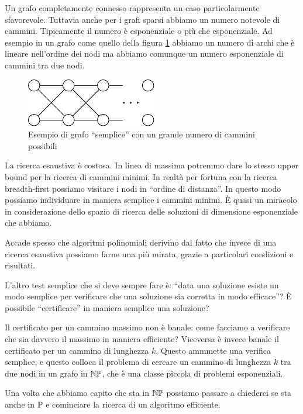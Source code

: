 Un grafo completamente connesso rappresenta un caso particolarmente sfavorevole. Tuttavia anche per
i grafi sparsi abbiamo un numero notevole di cammini. Tipicamente il numero è esponenziale o più
che esponenziale. Ad esempio in un grafo come quello della figura \ref{PathsNumber} abbiamo un
numero di archi che è lineare nell'ordine dei nodi ma abbiamo comunque un numero esponenziale di
cammini tra due nodi.

\begin{figure}[h]
    \begin{center}
        \includegraphics{./img/complexity_intro/ExponentialPathsNumber.pdf}
    \end{center}
    \caption{Esempio di grafo ``semplice'' con un grande numero di cammini possibili}
    \label{PathsNumber}
\end{figure}

La ricerca esaustiva è costosa. In linea di massima potremmo dare lo stesso upper bound per la
ricerca di cammini minimi. In realtà per fortuna con la ricerca breadth-first possiamo visitare i
nodi in ``ordine di distanza''. In questo modo possiamo individuare in maniera semplice i cammini
minimi. È quasi un miracolo in considerazione dello spazio di ricerca delle soluzioni di dimensione
esponenziale che abbiamo. 

Accade spesso che algoritmi polinomiali derivino dal fatto che invece di una ricerca esaustiva
possiamo farne una più mirata, grazie a particolari condizioni e risultati.

L'altro test semplice che si deve sempre fare è: ``data una soluzione esiste un modo semplice per
verificare che una soluzione sia corretta in modo efficace''? È possibile ``certificare'' in maniera
semplice una soluzione?

Il certificato per un cammino massimo non è banale: come facciamo a verificare che sia davvero il
massimo in maniera efficiente? Viceversa è invece banale il certificato per un cammino di lunghezza
$k$. Questo ammmette una verifica semplice, e questo colloca il problema di cercare un cammino di
lunghezza $k$ tra due nodi in un grafo in $\mathbb{NP}$, che è una classe piccola di problemi
esponenziali.

Una volta che abbiamo capito che sta in $\mathbb{NP}$ possiamo passare a chiederci se sta anche in
$\mathbb{P}$ e cominciare la ricerca di un algoritmo efficiente.


